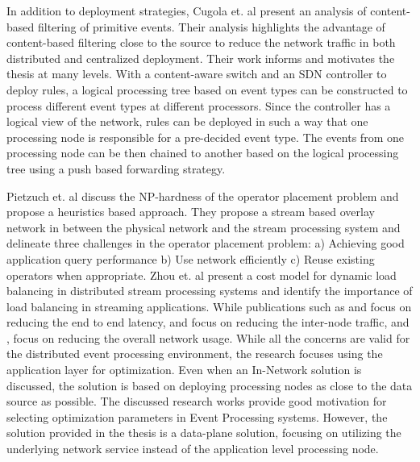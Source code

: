 In addition to deployment strategies, Cugola et. al present an analysis of content-based filtering of primitive events. Their analysis highlights the advantage of content-based filtering close to the source to reduce the network traffic in both distributed and centralized deployment. Their work informs and motivates the thesis at many levels. With a content-aware switch and an SDN controller to deploy rules, a logical processing tree based on event types can be constructed to process different event types at different processors.  Since the controller has a logical view of the network, rules can be deployed in such a way that one processing node is responsible for a pre-decided event type. The events from one processing node can be then chained to another based on the logical processing tree using a push based forwarding strategy.\newline 

Pietzuch et. al \cite{pietzuch2006network} discuss the NP-hardness of the operator placement problem and propose a heuristics based approach. They propose a stream based overlay network in between the physical network and the stream processing system and delineate three challenges in the operator placement problem: a) Achieving good application query performance b) Use network efficiently c) Reuse existing operators when appropriate. Zhou et. al \cite{zhou2006efficient} present a cost model for dynamic load balancing in distributed stream processing systems and identify the importance of load balancing in streaming applications. While publications such as \cite{backman2012managing} and \cite{chatzistergiou2014fast} focus on reducing the end to end latency, \cite{aniello2013adaptive} and \cite{cui2016big} focus on reducing the inter-node traffic, and \cite{rizou2010solving}, \cite{pietzuch2006network} focus on reducing the overall network usage. While all the concerns are valid for the distributed event processing environment, the research focuses using the application layer for optimization. Even when an In-Network solution is discussed, the solution is based on deploying processing nodes as close to the data source as possible. The discussed research works provide good motivation for selecting optimization parameters in Event Processing systems. However, the solution provided in the thesis is a data-plane solution, focusing on utilizing the underlying network service instead of the application level processing node.


